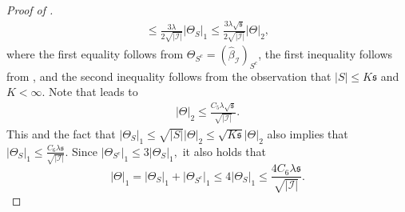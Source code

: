 \documentclass[11pt]{article}
\newcommand{\I}{{\mathcal I }}
\newcommand{\s}{ { \mathfrak{s}  } }
\theoremstyle{plain}
\theoremstyle{definition}
\begin{document}
\begin{proof}[Proof of ]
\begin{align}
 \le    \frac{3\lambda}{2\sqrt{  |\I|  }  }  | \Theta_{S}  | _1  \le \frac{3\lambda \sqrt \s }{2 \sqrt{  |\I|  } }  | \Theta  | _2 ,
 \end{align}  
 where the first  equality follows from $ \Theta  _{ S ^c} = ( \widehat \beta_\I    ) _{ S ^c}  $, the first inequality follows from  , and the second inequality follows from the observation that $|S|\le K \s $ and $K<\infty$.  Note  that    leads to 
\begin{align}
\label{eq:two sample lasso deviation 3} |\Theta |_2  \le   \frac{C _5 \lambda \sqrt  \s}{\sqrt{| \I |} } . \end{align} 
 This  and the fact that  $ | \Theta_{S}  | _1 \le \sqrt {|S|}   |\Theta|_2 \le \sqrt{K  \s } |\Theta|_2   $   also implies that 
 $   | \Theta_{S}  | _1 \le  \frac{C_6\lambda \s}{\sqrt{|\I| }}. $ 
 Since 
  $  | \Theta_{S^c }  | _1 \le 3  | \Theta_{S}  | _1 ,$ 
it also holds that 
$$ | \Theta   | _1 =  | \Theta_{S  }  | _1 +  | \Theta_{S^c }  | _1  \le 4  | \Theta_{S}  | _1 \le  \frac{4C_6\lambda \s}{\sqrt{|\I|} } .$$
  \end{proof}
\end{document}
